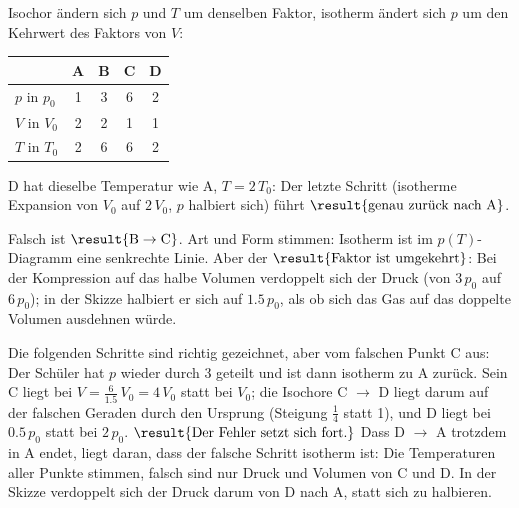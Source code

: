\begin{abcliste}
\abc Isochor ändern sich $p$ und $T$ um denselben Faktor, isotherm ändert sich $p$ um den Kehrwert des Faktors von $V$:
\begin{center}
\begin{tabular}{lcccc}
 & A & B & C & D \\ \hline
 $p$ in $p_0$ & 1 & 3 & 6 & 2 \\
 $V$ in $V_0$ & 2 & 2 & 1 & 1 \\
 $T$ in $T_0$ & 2 & 6 & 6 & 2
\end{tabular}
\end{center}
D hat dieselbe Temperatur wie A, $T = 2\,T_0$: Der letzte Schritt (isotherme Expansion von $V_0$ auf $2\,V_0$, $p$ halbiert sich) führt $\result{\text{genau zurück nach A}}$.

\abc Falsch ist $\result{\text{B} \to \text{C}}$. Art und Form stimmen: Isotherm ist im $p(T)$-Diagramm eine senkrechte Linie. Aber der $\result{\text{Faktor ist umgekehrt}}$: Bei der Kompression auf das halbe Volumen verdoppelt sich der Druck (von $3\,p_0$ auf $6\,p_0$); in der Skizze halbiert er sich auf $1.5\,p_0$, als ob sich das Gas auf das doppelte Volumen ausdehnen würde.

\abc Die folgenden Schritte sind richtig gezeichnet, aber vom falschen Punkt C aus: Der Schüler hat $p$ wieder durch 3 geteilt und ist dann isotherm zu A zurück. Sein C liegt bei $V = \frac{6}{1.5}\,V_0 = 4\,V_0$ statt bei $V_0$; die Isochore C $\to$ D liegt darum auf der falschen Geraden durch den Ursprung (Steigung $\frac14$ statt 1), und D liegt bei $0.5\,p_0$ statt bei $2\,p_0$. $\result{\text{Der Fehler setzt sich fort.}}$ Dass D $\to$ A trotzdem in A endet, liegt daran, dass der falsche Schritt isotherm ist: Die Temperaturen aller Punkte stimmen, falsch sind nur Druck und Volumen von C und D. In der Skizze verdoppelt sich der Druck darum von D nach A, statt sich zu halbieren.


\end{abcliste}
